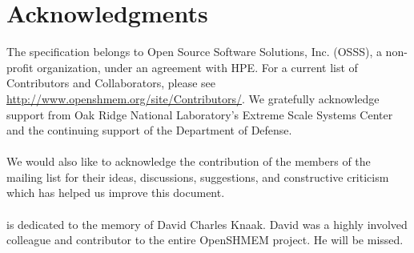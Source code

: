 \date{\today}

\section*{Acknowledgments}
The \openshmem specification belongs to Open Source Software Solutions, Inc.
(OSSS), a non-profit organization, under an agreement with HPE. For a current list
of Contributors and Collaborators, please see
  \url{http://www.openshmem.org/site/Contributors/}.
We gratefully acknowledge support from
Oak Ridge National Laboratory's
Extreme Scale Systems Center and the continuing support of the Department of Defense.\\
\\
We would also like to acknowledge the contribution of the members of the
\openshmem mailing list for their ideas, discussions, suggestions, and
constructive criticism which has helped us improve this document.\\
\\
\openshmem[1.4] is dedicated to the memory of David Charles Knaak. David was a highly involved
colleague and contributor to the entire OpenSHMEM project. He will be missed.
